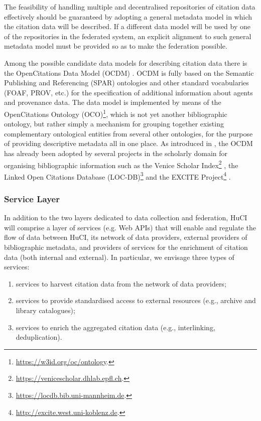 The feasibility of handling multiple and decentralised repositories of citation data effectively should be guaranteed by adopting a general metadata model in which the citation data will be described. If a different data model will be used by one of the repositories in the federated system, an explicit alignment to such general metadata model must be provided so as to make the federation possible.

Among the possible candidate data models for describing citation data there is the OpenCitations Data Model (OCDM) \cite{peroni_opencitations_2018}. OCDM is fully based on the Semantic Publishing and Referencing (SPAR) ontologies \cite{rutkowski_spar_2018} and other standard vocabularies (FOAF, PROV, etc.) for the specification of additional information about agents and provenance data. The data model is implemented by means of the OpenCitations Ontology (OCO)\footnote{\url{https://w3id.org/oc/ontology}.}, which is not yet another bibliographic ontology, but rather simply a mechanism for grouping together existing complementary ontological entities from several other ontologies, for the purpose of providing descriptive metadata all in one place. As introduced in \cite{pan_opencitations_2020}, the OCDM has already been adopted by several projects in the scholarly domain for organising bibliographic information such as the Venice Scholar Index\footnote{\url{https://venicescholar.dhlab.epfl.ch}.} \cite{colavizza_linked_2018}, the Linked Open Citations Database (LOC-DB)\footnote{\url{https://locdb.bib.uni-mannheim.de}.} \cite{lauscher_linked_2018} and the EXCITE Project\footnote{\url{http://excite.west.uni-koblenz.de}.} \cite{hosseini_excite_2019}.

\subsubsection{Service Layer}

In addition to the two layers dedicated to data collection and federation, HuCI will comprise a layer of services (e.g. Web APIs) that will enable and regulate the flow of data between HuCI, its network of data providers, external providers of bibliographic metadata, and providers of services for the enrichment of citation data (both internal and external). In particular, we envisage three types of services:
\begin{enumerate}
    \item services to harvest citation data from the network of data providers; 
    \item services to provide standardised access to external resources (e.g., archive and library catalogues);
    \item services to enrich the aggregated citation data (e.g., interlinking, deduplication).
\end{enumerate}

